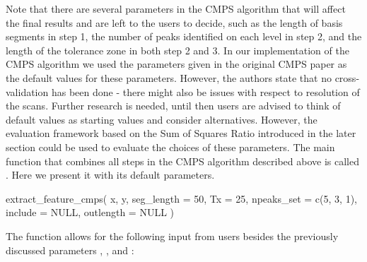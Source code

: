 Note that there are several parameters in the CMPS algorithm that will
affect the final results and are left to the users to decide, such as
the length of basis segments  in step 1, the number of
peaks  identified on each level in step 2, and the
length of the tolerance zone  in both step 2 and 3. In our
implementation of the CMPS algorithm we used the parameters given in the
original CMPS paper \citep{cmps} as the default values for these
parameters. However, the authors state that no cross-validation has been
done - there might also be issues with respect to resolution of the
scans. Further research is needed, until then users are advised to think
of default values as starting values and consider alternatives. However,
the evaluation framework based on the Sum of Squares Ratio introduced in
the later section could be used to evaluate the choices of these
parameters. The main function that combines all steps in the CMPS
algorithm described above is called .
Here we present it with its default parameters.

\begin{Schunk}
\begin{Sinput}
extract_feature_cmps(
  x,
  y,
  seg_length = 50,
  Tx = 25,
  npeaks_set = c(5, 3, 1),
  include = NULL,
  outlength = NULL
)
\end{Sinput}
\end{Schunk}

The function  allows for the following
input from users besides the previously discussed parameters
, , and :

